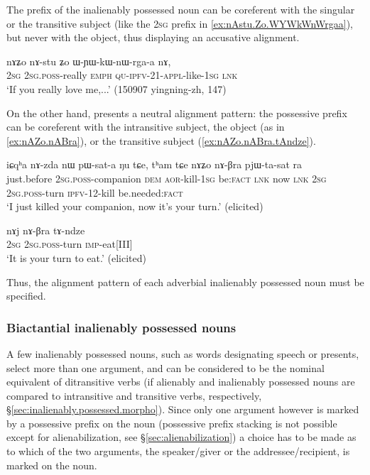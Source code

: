 The prefix of the inalienably possessed noun  can be coreferent with the singular or the transitive subject (like the \textsc{2sg} prefix  in \ref{ex:nAstu.Zo.WYWkWnWrgaa}), but never with the object, thus displaying an accusative alignment.

\begin{exe}
\ex \label{ex:nAstu.Zo.WYWkWnWrgaa}
\gll nɤʑo nɤ-stu ʑo ɯ-ɲɯ-kɯ-nɯ-rga-a nɤ, \\
\textsc{2sg} \textsc{2sg}.\textsc{poss}-really \textsc{emph} \textsc{qu}-\textsc{ipfv}-2\fl{}1-\textsc{appl}-like-\textsc{1sg} \textsc{lnk} \\
\glt `If you really love me,...' (150907 yingning-zh, 147)
\end{exe}

On the other hand,  presents a neutral alignment pattern: the possessive prefix can be coreferent with the intransitive subject, the object (as in \ref{ex:nAZo.nABra}), or the transitive subject (\ref{ex:nAZo.nABra.tAndze}).


\begin{exe}
\ex \label{ex:nAZo.nABra}
\gll iɕqʰa nɤ-zda nɯ pɯ-sat-a ŋu tɕe, tʰam tɕe nɤʑo nɤ-βra pjɯ-ta-sat ra \\
just.before \textsc{2sg}.\textsc{poss}-companion \textsc{dem} \textsc{aor}-kill-\textsc{1sg} be:\textsc{fact} \textsc{lnk} now \textsc{lnk} \textsc{2sg} \textsc{2sg}.\textsc{poss}-turn \textsc{ipfv}-1\fl{}2-kill be.needed:\textsc{fact} \\
\glt `I just killed your companion, now it's your turn.' (elicited)
\end{exe}

\begin{exe}
\ex \label{ex:nAZo.nABra.tAndze}
\gll nɤj nɤ-βra tɤ-ndze  \\
\textsc{2sg} \textsc{2sg}.\textsc{poss}-turn \textsc{imp}-eat[III] \\
\glt `It is your turn to eat.' (elicited)
\end{exe}

Thus, the alignment pattern of each adverbial inalienably possessed noun must be specified.

\subsubsection{Biactantial inalienably possessed nouns} \label{sec:biactantial.ipn}
A few inalienably possessed nouns, such as words designating speech or presents, select more than one argument, and can be considered to be the nominal equivalent of ditransitive verbs (if alienably and inalienably possessed nouns are compared to intransitive and transitive verbs, respectively, §\ref{sec:inalienably.possessed.morpho}). Since only one argument however is marked by a possessive prefix on the noun (possessive prefix stacking is not possible except for alienabilization, see §\ref{sec:alienabilization}) a choice has to be made as to which of the two arguments, the speaker/giver or the addressee/recipient, is marked on the noun.

